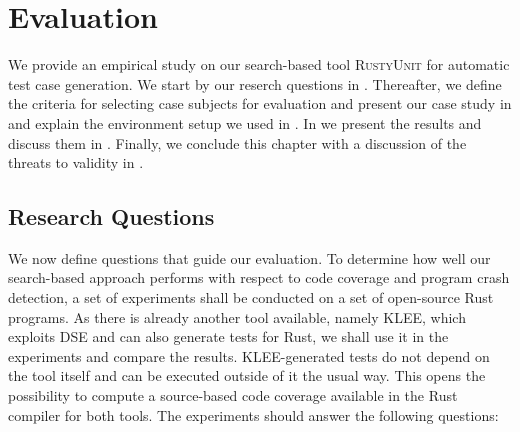 \documentclass[paper=a4,%
  twoside,%
  BCOR4mm,%
  abstract=true,%
  toc=bibliography,%
  chapterprefix=true,%
  toc=bibliographynumbered,%
  open=right,%
  english,%
  pagesize=pdftex]{scrreprt}
\newcommand{\tech}{\textsc{RustyUnit}\xspace}
\newcommand{\sut}{\ac{SUT}\xspace}
\begin{document}
\clearpage
\chapter{Evaluation}
\label{chap:evaluation}

We provide an empirical study on our search-based tool \tech for automatic test case generation. We start by our reserch questions in . Thereafter, we define the criteria for selecting case subjects for evaluation and present our case study in  and explain the environment setup we used in . In  we present the results and discuss them in . Finally, we conclude this chapter with a discussion of the threats to validity in .


\section{Research Questions}
\label{sec:research-questions}
We now define questions that guide our evaluation. To determine how well our search-based approach performs with respect to code coverage and program crash detection, a set of experiments shall be conducted on a set of open-source Rust programs. As there is already another tool available, namely \textsc{KLEE}, which exploits \ac{DSE} and can also generate tests for Rust, we shall use it in the experiments and compare the results. \textsc{KLEE}-generated tests do not depend on the tool itself and can be executed outside of it the usual way. This opens the possibility to compute a source-based code coverage available in the Rust compiler for both tools. The experiments should answer the following questions:

\end{document}
